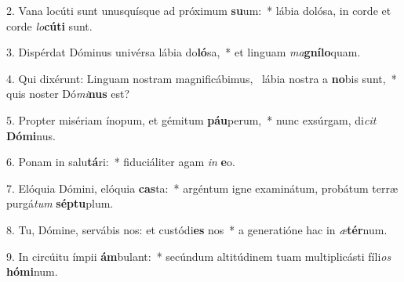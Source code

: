 2. Vana locúti sunt unusquísque ad próximum \textbf{su}um:~*  lábia dolósa, in corde et corde \textit{lo}\textbf{cú}\textbf{ti} sunt.\

3. Dispérdat Dóminus univérsa lábia do\textbf{ló}sa,~*  et linguam \textit{ma}\textbf{gní}\textbf{lo}quam.\

4. Qui dixérunt: Linguam nostram magnificábimus, \dag\  lábia nostra a \textbf{no}bis sunt,~*  quis noster Dó\textit{mi}\textbf{nus} est?\

5. Propter misériam ínopum, et gémitum \textbf{páu}perum,~*  nunc exsúrgam, di\textit{cit} \textbf{Dó}\textbf{mi}nus.\

6. Ponam in salu\textbf{tá}ri:~*  fiduciáliter agam \textit{in} \textbf{e}o.\

7. Elóquia Dómini, elóquia \textbf{cas}ta:~*  argéntum igne examinátum, probátum terræ purgá\textit{tum} \textbf{sép}\textbf{tu}plum.\

8. Tu, Dómine, servábis nos: et custódi\textbf{es} nos~*  a generatióne hac in \textit{æ}\textbf{tér}num.\

9. In circúitu ímpii \textbf{ám}bulant:~*  secúndum altitúdinem tuam multiplicásti fíli\textit{os} \textbf{hó}\textbf{mi}num.\

